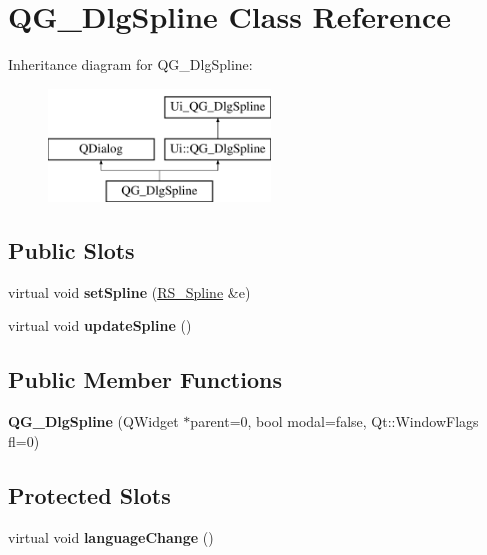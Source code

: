 \hypertarget{classQG__DlgSpline}{\section{Q\-G\-\_\-\-Dlg\-Spline Class Reference}
\label{classQG__DlgSpline}
}
Inheritance diagram for Q\-G\-\_\-\-Dlg\-Spline\-:\begin{figure}[H]
\begin{center}
\leavevmode
\includegraphics[height=3.000000cm]{classQG__DlgSpline}
\end{center}
\end{figure}
\subsection*{Public Slots}
\begin{DoxyCompactItemize}
\item 
\hypertarget{classQG__DlgSpline_a0911ba82556b9dc6e86b1f75344ecb8d}{virtual void {\bfseries set\-Spline} (\hyperlink{classRS__Spline}{R\-S\-\_\-\-Spline} \&e)}\label{classQG__DlgSpline_a0911ba82556b9dc6e86b1f75344ecb8d}

\item 
\hypertarget{classQG__DlgSpline_ac9c9a32f5dd4663566c03d603b143719}{virtual void {\bfseries update\-Spline} ()}\label{classQG__DlgSpline_ac9c9a32f5dd4663566c03d603b143719}

\end{DoxyCompactItemize}
\subsection*{Public Member Functions}
\begin{DoxyCompactItemize}
\item 
\hypertarget{classQG__DlgSpline_ad136b37e4dd85831eb406ca1b0a0854f}{{\bfseries Q\-G\-\_\-\-Dlg\-Spline} (Q\-Widget $\ast$parent=0, bool modal=false, Qt\-::\-Window\-Flags fl=0)}\label{classQG__DlgSpline_ad136b37e4dd85831eb406ca1b0a0854f}

\end{DoxyCompactItemize}
\subsection*{Protected Slots}
\begin{DoxyCompactItemize}
\item 
\hypertarget{classQG__DlgSpline_af6ec0c8b59e6d417bf7f2748273dc82c}{virtual void {\bfseries language\-Change} ()}\label{classQG__DlgSpline_af6ec0c8b59e6d417bf7f2748273dc82c}

\end{DoxyCompactItemize}
